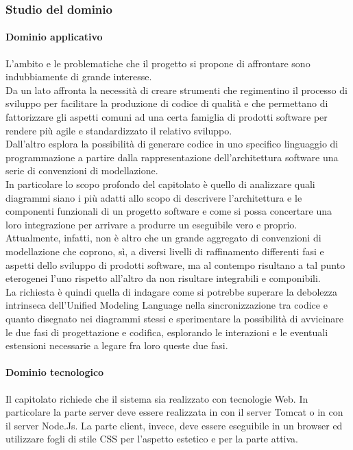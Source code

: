 		\subsubsection{Studio del dominio}
			\paragraph{Dominio applicativo}
			L'ambito e le problematiche che il progetto si propone di affrontare sono indubbiamente di grande interesse. 
			\\Da un lato affronta la necessità di 
			creare strumenti che regimentino il processo di sviluppo per facilitare la produzione di codice di qualità e che permettano di fattorizzare gli 
			aspetti comuni ad una certa famiglia di prodotti software per rendere più agile e standardizzato il relativo sviluppo.
			\\Dall'altro esplora la possibilità di generare codice in uno specifico linguaggio di programmazione a partire dalla rappresentazione dell'architettura 
			software una serie di convenzioni di modellazione.
			\\In particolare lo scopo profondo del capitolato è quello di analizzare quali diagrammi  siano i più adatti allo scopo di descrivere l'architettura 
			e le componenti funzionali di un progetto software e come si possa concertare una loro integrazione per arrivare a produrre un eseguibile vero e proprio. 
			\\Attualmente, infatti,  non è altro che un grande aggregato di convenzioni di modellazione che coprono, sì, a diversi livelli di raffinamento differenti 
			fasi e aspetti dello sviluppo di prodotti software, ma al contempo risultano 
			a tal punto eterogenei l'uno rispetto all'altro da non risultare integrabili e componibili. 
			\\La richiesta è quindi quella di indagare come si potrebbe superare la debolezza intrinseca dell'Unified Modeling Language nella sincronizzazione tra 
			codice e quanto disegnato nei diagrammi stessi e sperimentare la possibilità di avvicinare le due fasi di progettazione e codifica, esplorando le 
			interazioni e le eventuali estensioni necessarie a legare fra loro queste due fasi.
			\paragraph{Dominio tecnologico}
			Il capitolato richiede che il sistema sia realizzato con tecnologie Web. In particolare la parte server deve essere realizzata in  con il server 
			Tomcat o in  con il server Node.Js. La parte client, invece, deve essere eseguibile in un browser  ed utilizzare fogli di stile CSS per 
			l'aspetto estetico e  per la parte attiva.
